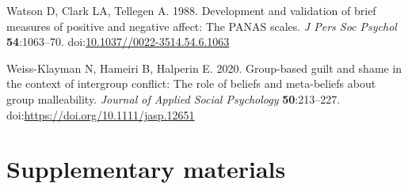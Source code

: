 \documentclass[
]{article}
\newlength{\cslhangindent}
\newlength{\cslentryspacingunit} %
\newenvironment{CSLReferences}[2] %
 {%
  \setlength{\parindent}{0pt}
  \ifodd #1
  \let\oldpar\par
  \def\par{\hangindent=\cslhangindent\oldpar}
  \fi
  \setlength{\parskip}{#2\cslentryspacingunit}
 }%
 {}
\newcommand{\beginsupplement}{\setcounter{table}{0}
\renewcommand{\thetable}{S\arabic{table}}
\setcounter{figure}{0}
\renewcommand{\thefigure}{S\arabic{figure}}}
\begin{document}
\begin{CSLReferences}{1}{0}
\leavevmode{}%
Watson D, Clark LA, Tellegen A. 1988. Development and validation of brief measures of positive and negative affect: The PANAS scales. \emph{J Pers Soc Psychol} \textbf{54}:1063--70. doi:\href{https://doi.org/10.1037//0022-3514.54.6.1063}{10.1037//0022-3514.54.6.1063}

\leavevmode{}%
Weiss-Klayman N, Hameiri B, Halperin E. 2020. Group-based guilt and shame in the context of intergroup conflict: The role of beliefs and meta-beliefs about group malleability. \emph{Journal of Applied Social Psychology} \textbf{50}:213--227. doi:\url{https://doi.org/10.1111/jasp.12651}

\end{CSLReferences}

\hypertarget{supplementary-materials}{%
\section*{Supplementary materials}\label{supplementary-materials}}

\beginsupplement
\end{document}
